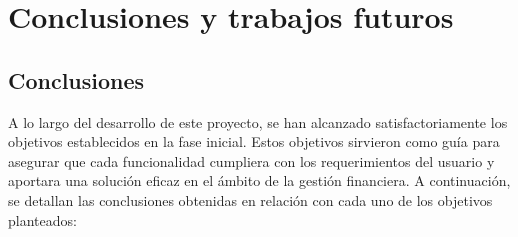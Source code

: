 \chapter{Conclusiones y trabajos futuros}

\section{Conclusiones}
A lo largo del desarrollo de este proyecto, se han alcanzado satisfactoriamente los objetivos establecidos en la fase inicial. Estos objetivos sirvieron como guía para asegurar que cada funcionalidad cumpliera con los requerimientos del usuario y aportara una solución eficaz en el ámbito de la gestión financiera. A continuación, se detallan las conclusiones obtenidas en relación con cada uno de los objetivos planteados:

